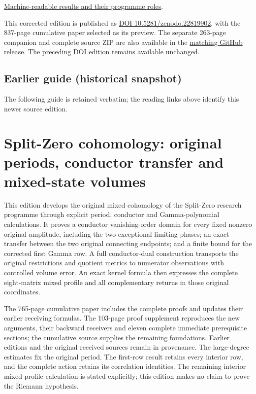 \documentclass[
]{article}
\begin{document}
\href{https://github.com/KokunoYumeto/zeta-function-research-reader/blob/main/workbenches/splitzero-tandem/continuations/20260917-cited-full-tail-return/research_index/PROGRAM_INDEX.json}{Machine-readable
results and their programme roles}.

This corrected edition is published as
\href{https://zenodo.org/records/22819902}{DOI 10.5281/zenodo.22819902},
with the 837-page cumulative paper selected as its preview. The separate
263-page companion and complete source ZIP are also available in the
\href{https://github.com/KokunoYumeto/zeta-function-research-reader/releases/tag/splitzero-cited-receiver-2026-09-17-9e3f86fa}{matching
GitHub release}. The preceding
\href{https://zenodo.org/records/22814080}{DOI edition} remains
available unchanged.

\subsection{Earlier guide (historical
snapshot)}\label{earlier-guide-historical-snapshot-4}

The following guide is retained verbatim; the reading links above
identify this newer source edition.

\section{Split-Zero cohomology: original periods, conductor transfer and
mixed-state
volumes}\label{split-zero-cohomology-original-periods-conductor-transfer-and-mixed-state-volumes}

This edition develops the original mixed cohomology of the Split-Zero
research programme through explicit period, conductor and
Gamma-polynomial calculations. It proves a conductor vanishing-order
domain for every fixed nonzero original amplitude, including the two
exceptional limiting phases; an exact transfer between the two original
connecting endpoints; and a finite bound for the corrected first Gamma
row. A full conductor-dual construction transports the original
restrictions and quotient metrics to numerator observations with
controlled volume error. An exact kernel formula then expresses the
complete eight-matrix mixed profile and all complementary returns in
those original coordinates.

The 765-page cumulative paper includes the complete proofs and updates
their earlier receiving formulas. The 103-page proof supplement
reproduces the new arguments, their backward receivers and eleven
complete immediate prerequisite sections; the cumulative source supplies
the remaining foundations. Earlier editions and the original received
sources remain in provenance. The large-degree estimates fix the
original period. The first-row result retains every interior row, and
the complete action retains its correlation identities. The remaining
interior mixed-profile calculation is stated explicitly; this edition
makes no claim to prove the Riemann hypothesis.
\end{document}
